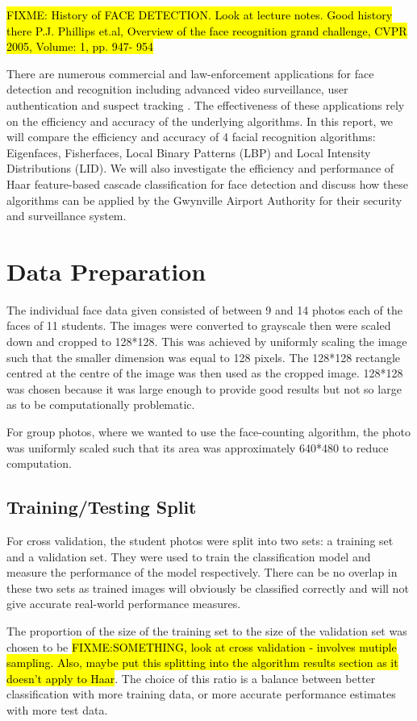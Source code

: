 \documentclass{article}
\begin{document}
\hl{FIXME: History of FACE DETECTION. Look at lecture notes. Good history there P.J. Phillips et.al, Overview of the face recognition grand challenge, CVPR 2005, Volume: 1, pp. 947- 954 }

There are numerous commercial and law-enforcement applications for face detection and recognition including advanced video surveillance, user authentication and suspect tracking \cite{zhao2003face}. The effectiveness of these applications rely on the efficiency and accuracy of the underlying algorithms. In this report, we will compare the efficiency and accuracy of 4 facial recognition algorithms: Eigenfaces, Fisherfaces, Local Binary Patterns (LBP) and Local Intensity Distributions (LID). We will also investigate the efficiency and performance of Haar feature-based cascade classification for face detection and discuss how these algorithms can be applied by the Gwynville Airport Authority for their security and surveillance system.


\section{Data Preparation}
The individual face data given consisted of between 9 and 14 photos each of the faces of 11 students. The images were converted to grayscale then were scaled down and cropped to 128*128. This was achieved by uniformly scaling the image such that the smaller dimension was equal to 128 pixels. The 128*128 rectangle centred at the centre of the image was then used as the cropped image. 128*128 was chosen because it was large enough to provide good results but not so large as to be computationally problematic.

For group photos, where we wanted to use the face-counting algorithm, the photo was uniformly scaled such that its area was approximately 640*480 to reduce computation.

\subsection{Training/Testing Split}
For cross validation, the student photos were split into two sets: a training set and a validation set. They were used to train the classification model and measure the performance of the model respectively. There can be no overlap in these two sets as trained images will obviously be classified correctly and will not give accurate real-world performance measures.

The proportion of the size of the training set to the size of the validation set was chosen to be \hl{FIXME:SOMETHING, look at cross validation - involves mutiple sampling. Also, maybe put this splitting into the algorithm results section as it doesn't apply to Haar}. The choice of this ratio is a balance between better classification with more training data, or more accurate performance estimates with more test data.
\end{document}
